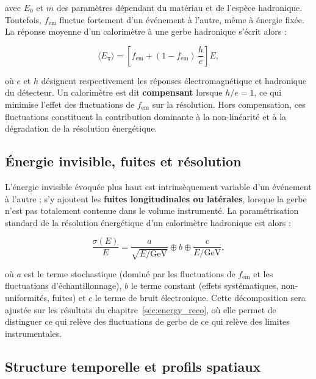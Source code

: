 avec $E_0$ et $m$ des paramètres dépendant du matériau et de l'espèce hadronique. Toutefois,
$f_{\mathrm{em}}$ fluctue fortement d'un événement à l'autre, même à énergie fixée. La réponse
moyenne d'un calorimètre à une gerbe hadronique s'écrit alors \cite{wigmans2000} :

\begin{equation}
\langle E_{\pi}\rangle = \left[f_{\mathrm{em}} + (1 - f_{\mathrm{em}})\,\frac{h}{e}\right] E,
\label{eq:he}
\end{equation}

où $e$ et $h$ désignent respectivement les réponses électromagnétique et hadronique du détecteur.
Un calorimètre est dit \textbf{compensant} lorsque $h/e = 1$, ce qui minimise l'effet des
fluctuations de $f_{\mathrm{em}}$ sur la résolution. Hors compensation, ces fluctuations constituent
la contribution dominante à la non-linéarité et à la dégradation de la résolution énergétique.

\subsection{Énergie invisible, fuites et résolution}

L'énergie invisible évoquée plus haut est intrinsèquement variable d'un événement à
l'autre \cite{fabjan2003} ; s'y ajoutent les \textbf{fuites longitudinales ou latérales}, lorsque la
gerbe n'est pas totalement contenue dans le volume instrumenté. La paramétrisation standard de la
résolution énergétique d'un calorimètre hadronique est alors \cite{fabjan2003} :

\begin{equation}
\frac{\sigma(E)}{E} = \frac{a}{\sqrt{E/\mathrm{GeV}}} \oplus b \oplus \frac{c}{E/\mathrm{GeV}},
\label{eq:resolution}
\end{equation}

où $a$ est le terme stochastique (dominé par les fluctuations de $f_{\mathrm{em}}$ et les
fluctuations d'échantillonnage), $b$ le terme constant (effets systématiques, non-uniformités,
fuites) et $c$ le terme de bruit électronique. Cette décomposition sera ajustée sur les résultats
du chapitre~\ref{sec:energy_reco}, où elle permet de distinguer ce qui relève des fluctuations de
gerbe de ce qui relève des limites instrumentales.

\subsection{Structure temporelle et profils spatiaux}

